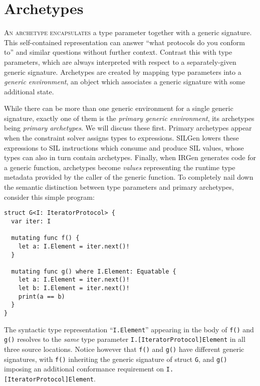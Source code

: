\documentclass[../generics]{subfiles}
\begin{document}
\chapter{Archetypes}\label{genericenv}

\lettrine{A}{n archetype encapsulates} a type parameter together with a generic signature. This self-contained representation can answer ``what protocols do you conform to'' and similar questions without further context. Contrast this with type parameters, which are always interpreted with respect to a separately-given generic signature. Archetypes are created by mapping type parameters into a \emph{generic environment}, an object which associates a generic signature with some additional state.

While there can be more than one generic environment for a single generic signature, exactly one of them is the \emph{primary generic environment}, its archetypes being \emph{primary archetypes}. We will discuss these first. Primary archetypes appear when the constraint solver assigns types to expressions. SILGen lowers these expressions to SIL instructions which consume and produce SIL values, whose types can also in turn contain archetypes. Finally, when IRGen generates code for a generic function, archetypes become \emph{values} representing the runtime type metadata provided by the caller of the generic function. To completely nail down the semantic distinction between type parameters and primary archetypes, consider this simple program:
\begin{Verbatim}
struct G<I: IteratorProtocol> {
  var iter: I

  mutating func f() {
    let a: I.Element = iter.next()!
  }
  
  mutating func g() where I.Element: Equatable {
    let a: I.Element = iter.next()!
    let b: I.Element = iter.next()!
    print(a == b)
  }
}
\end{Verbatim}
%
The syntactic type representation ``\texttt{I.Element}'' appearing in the body of \texttt{f()} and \texttt{g()} resolves to the \emph{same} type parameter \texttt{I.[IteratorProtocol]Element} in all three source locations. Notice however that \texttt{f()} and \texttt{g()} have different generic signatures, with \texttt{f()} inheriting the generic signature of struct \texttt{G}, and \texttt{g()} imposing an additional conformance requirement on \texttt{I.[IteratorProtocol]Element}.
\end{document}
